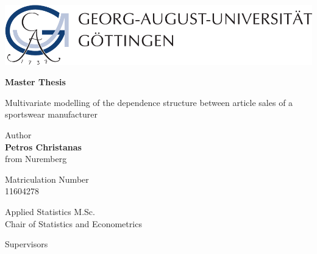 
\thispagestyle{empty}
\begin{center}


\begin{minipage}{0.75\linewidth}
    \centering
    \includegraphics[scale = 0.7]{figures/uni_goettingen_logo.pdf}\\
    
    \vspace{1cm}
    
{{\Huge \textbf{Master Thesis} \par}}
    
\vspace{0.5cm}
    
    {{\LARGE Multivariate modelling of the dependence structure between article sales of a sportswear manufacturer\par}}
    \vspace{1cm}
    
    
\begin{center}
Author\\
{\LARGE \textbf{Petros Christanas}} \\
{\large from Nuremberg}


\vspace{0.5cm}

Matriculation Number \\
{\large 11604278}

\vspace{1cm}

{\Large Applied Statistics M.Sc.}\\
{\large Chair of Statistics and Econometrics}

\end{center}
    
    \end{minipage}
\end{center}


\vspace{1.5cm}

\noindent Supervisors\\
 \\
 \\

\vspace{0.5cm}
    
\begin{flushleft}
 \\
\end{flushleft}

    
    

\clearpage